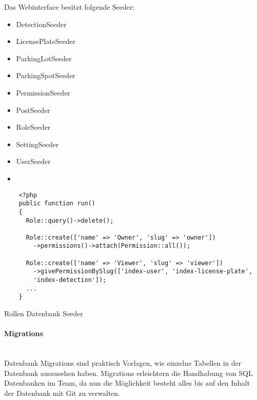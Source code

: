 Das Webinterface besitzt folgende Seeder:

\begin{multicols}{2}
  \begin{itemize}
    \item DetectionSeeder  \item LicensePlateSeeder \item ParkingLotSeeder \item ParkingSpotSeeder
    \item PermissionSeeder \item PostSeeder \item RoleSeeder \item SettingSeeder
    \item UserSeeder \item[\vspace{\fill}]
  \end{itemize}
\end{multicols}

\begin{listing}[H]
  \begin{verbatim}
    <?php
    public function run()
    {
      Role::query()->delete();
    
      Role::create(['name' => 'Owner', 'slug' => 'owner'])
        ->permissions()->attach(Permission::all());
    
      Role::create(['name' => 'Viewer', 'slug' => 'viewer'])
        ->givePermissionBySlug(['index-user', 'index-license-plate',
        'index-detection']);
      ...
    }
  \end{verbatim}
  \caption{Rollen Datenbank Seeder}
\end{listing}

\paragraph{Migrations}\mbox{}\\
Datenbank Migrations sind praktisch Vorlagen, wie einzelne Tabellen in der
Datenbank auszusehen haben. Migrations erleichtern die Handhabung von SQL
Datenbanken im Team, da nun die Möglichkeit besteht alles bis auf den Inhalt der
Datenbank mit Git zu verwalten.

